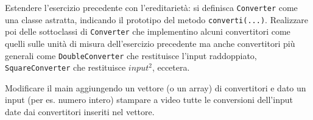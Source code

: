 \documentclass[addpoints,12pt,answers]{exam}
\begin{document}
Estendere l'esercizio precedente con l'ereditarietà: si definisca \texttt{Converter}
come una classe astratta, indicando il prototipo del metodo \texttt{converti(...)}.
Realizzare poi delle sottoclassi di \texttt{Converter} che implementino alcuni convertitori
come quelli sulle unità di misura dell'esercizio precedente ma anche convertitori più
generali come \texttt{DoubleConverter} che restituisce l'input raddoppiato,
\texttt{SquareConverter} che restituisce $input^2$, eccetera.

Modificare il main aggiungendo un vettore (o un array) di convertitori e dato un input
(per es. numero intero) stampare a video tutte le conversioni dell'input date dai
convertitori inseriti nel vettore.
\end{document}
